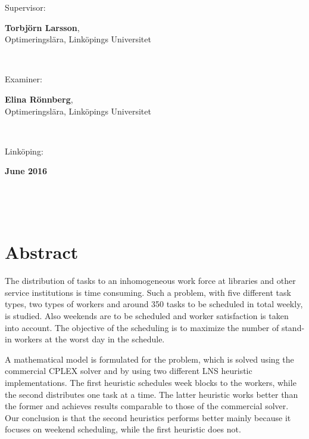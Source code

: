 \documentclass[a4paper, 10pt, twoside, openright]{book}
\newcommand{\putabstract}[0]{%
The distribution of tasks to an inhomogeneous work force at libraries and other service institutions is time consuming. Such a problem, with five different task types, two types of workers and around 350 tasks to be scheduled in total weekly, is studied. Also weekends are to be scheduled and worker satisfaction is taken into account. The objective of the scheduling is to maximize the number of stand-in workers at the worst day in the schedule.

A mathematical model is formulated for the problem, which is solved using the commercial CPLEX solver and by using two different LNS heuristic implementations. The first heuristic schedules week blocks to the workers, while the second distributes one task at a time. The latter heuristic works better than the former and achieves results comparable to those of the commercial solver. Our conclusion is that the second heuristics performs better mainly because it focuses on weekend scheduling, while the first heuristic does not.}
\newcommand{\putthemonth}[0]{June }
\newcommand{\putshortdate}[0]{2016}
\newcommand{\putmydate}[0]{\putthemonth \putshortdate}
\newcommand{\putexaminer}[0]{Elina Rönnberg}
\newcommand{\putsupervisor}[0]{Torbjörn Larsson}
\newcommand{\putdepartment}[0]{Optimeringslära}
\newcommand{\putliu}[0]{Linköpings Universitet}
\begin{document}
{\begin{minipage}{150mm}
                Supervisor:\hspace*{3pt}
                \begin{minipage}[t]{120mm}
                  \textbf{\putsupervisor}, \\\putdepartment, \putliu
                \end{minipage} \\ \vspace*{4mm}
                
                Examiner:\hspace*{3pt}
                \begin{minipage}[t]{120mm}
                  \textbf{\putexaminer}, \\\putdepartment, \putliu
                \end{minipage} \\ \vspace*{4mm}
                
                Linköping:
                \begin{minipage}[t]{70mm}
                  \textbf{\putmydate}
                \end{minipage} \\ \vspace*{4mm}
              \end{minipage} \\ \hfill
}

\maketitle

\phantom{crap}
\thispagestyle{empty}
\pagestyle{empty}

\setlength{\unitlength}{1mm}


\setlength{\unitlength}{1pt}

\pagestyle{fancy}

\chapter*{Abstract}
\putabstract
\end{document}
